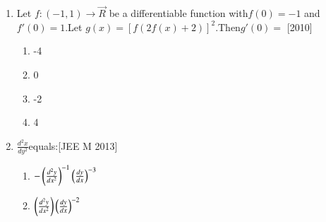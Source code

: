 \documentclass[journal,12pt,twocolumn]{IEEEtran}
\theoremstyle{remark}
\begin{document}
\begin{enumerate}
    \hfill[2009]\break
    \begin{enumerate}
    \item 1
    \item $\log2$
    \item -$\log2$
    \item -1\\
    \end{enumerate}
    \item Let $f:(-1,1)\rightarrow\vec{R}$ be a differentiable function with$f(0)=-1$ and $f'(0)=1$.Let $g(x)=[f(2f(x)+2)]^2$.Then$g'(0)=$
	    \hfill[2010]
	    \begin{enumerate}
	\item -4
	\item 0
	\item -2
	\item 4\\
	    \end{enumerate}
    \item $\frac{d^2x}{dy^2}$equals:\hfill[JEE M 2013]\break
	    \begin{enumerate}
		    \item  $-\left({\frac{d^2y}{dx^2}}\right)^{-1}\left({\frac{dy}{dx}}\right)^{-3}$
		    \item $\left({\frac{d^2y}{dx^2}}\right)\left({\frac{dy}{dx}}\right)^{-2}$


\end{enumerate}
\end{enumerate}
\end{document}
